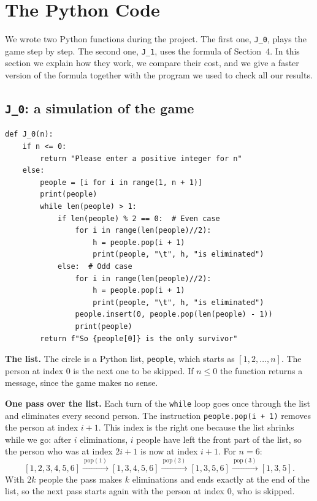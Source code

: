 \section{The Python Code}

We wrote two Python functions during the project. The first one, \texttt{J\_0},
plays the game step by step. The second one, \texttt{J\_1}, uses the formula of
Section~4. In this section we explain how they work, we compare their cost,
and we give a faster version of the formula together with the program we used
to check all our results.

\subsection{\texorpdfstring{\texttt{J\_0}: a simulation of the game}{J\_0: a simulation of the game}}

\begin{lstlisting}[language=iPython, caption={The function \texttt{J\_0}, which simulates the game.}]
def J_0(n):
    if n <= 0:
        return "Please enter a positive integer for n"
    else:
        people = [i for i in range(1, n + 1)]
        print(people)
        while len(people) > 1:
            if len(people) % 2 == 0:  # Even case
                for i in range(len(people)//2):
                    h = people.pop(i + 1)
                    print(people, "\t", h, "is eliminated")
            else:  # Odd case
                for i in range(len(people)//2):
                    h = people.pop(i + 1)
                    print(people, "\t", h, "is eliminated")
                people.insert(0, people.pop(len(people) - 1))
                print(people)
        return f"So {people[0]} is the only survivor"
\end{lstlisting}

\textbf{The list.} The circle is a Python list, \texttt{people}, which starts
as $[1,2,\dots,n]$. The person at index $0$ is the next one to be skipped. If
$n\leq0$ the function returns a message, since the game makes no sense.

\textbf{One pass over the list.} Each turn of the \texttt{while} loop goes once
through the list and eliminates every second person. The instruction
\texttt{people.pop(i + 1)} removes the person at index $i+1$. This index is
the right one because the list shrinks while we go: after $i$ eliminations,
$i$ people have left the front part of the list, so the person who was at
index $2i+1$ is now at index $i+1$. For $n=6$:
\[
[1,2,3,4,5,6]\xrightarrow{\ \text{pop}(1)\ }[1,3,4,5,6]
\xrightarrow{\ \text{pop}(2)\ }[1,3,5,6]
\xrightarrow{\ \text{pop}(3)\ }[1,3,5].
\]
With $2k$ people the pass makes $k$ eliminations and ends exactly at the end
of the list, so the next pass starts again with the person at index $0$, who
is skipped.

